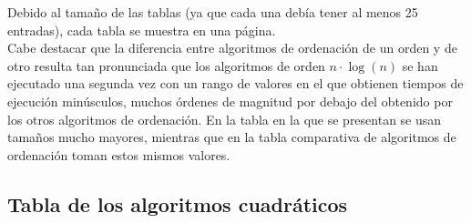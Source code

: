 \documentclass[a4paper, 11pt]{article}
\begin{document}
Debido al tamaño de las tablas (ya que cada una debía tener al menos 25 entradas),
cada tabla se muestra en una página. \\

Cabe destacar que la diferencia entre algoritmos de ordenación de un orden y de
otro resulta tan pronunciada que los algoritmos de orden $n \cdot \log (n)$ se
han ejecutado una segunda vez con un rango de valores en el que obtienen tiempos
de ejecución minúsculos, muchos órdenes de magnitud por debajo del obtenido por
los otros algoritmos de ordenación. En la tabla en la que se presentan se usan
tamaños mucho mayores, mientras que en la tabla comparativa de algoritmos de
ordenación toman estos mismos valores.

\subsection{Tabla de los algoritmos cuadráticos}
\end{document}

